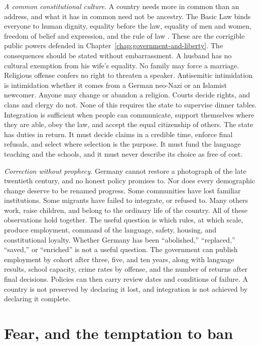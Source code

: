 \documentclass[12pt,a4paper]{book}
\begin{document}
\emph{A common constitutional culture.} A country needs more in common than an address, and what it has in common need not be ancestry. The Basic Law binds everyone to human dignity, equality before the law, equality of men and women, freedom of belief and expression, and the rule of law \cite{Grundgesetz2025}. These are the corrigible public powers defended in Chapter~\ref{chap:government-and-liberty}. The consequences should be stated without embarrassment. A husband has no cultural exemption from his wife's equality. No family may force a marriage. Religious offense confers no right to threaten a speaker. Antisemitic intimidation is intimidation whether it comes from a German neo-Nazi or an Islamist newcomer. Anyone may change or abandon a religion. Courts decide rights, and clans and clergy do not. None of this requires the state to supervise dinner tables. Integration is sufficient when people can communicate, support themselves where they are able, obey the law, and accept the equal citizenship of others. The state has duties in return. It must decide claims in a credible time, enforce final refusals, and select where selection is the purpose. It must fund the language teaching and the schools, and it must never describe its choice as free of cost.

\emph{Correction without prophecy.} Germany cannot restore a photograph of the late twentieth century, and no honest policy promises to. Nor does every demographic change deserve to be renamed progress. Some communities have lost familiar institutions. Some migrants have failed to integrate, or refused to. Many others work, raise children, and belong to the ordinary life of the country. All of these observations hold together. The useful question is which rules, at which scale, produce employment, command of the language, safety, housing, and constitutional loyalty. Whether Germany has been ``abolished,'' ``replaced,'' ``saved,'' or ``enriched'' is not a useful question. The government can publish employment by cohort after three, five, and ten years, along with language results, school capacity, crime rates by offense, and the number of returns after final decisions. Policies can then carry review dates and conditions of failure. A country is not preserved by declaring it lost, and integration is not achieved by declaring it complete.

\section{Fear, and the temptation to ban}
\end{document}
